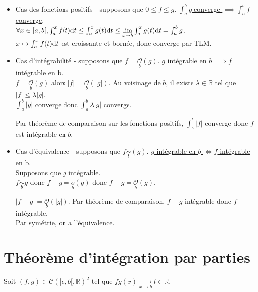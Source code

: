 \documentclass[]{article}
\begin{document}
\begin{itemize}
    \item Cas des fonctions positifs - supposons que $0 \leq f \leq g$. \underline{$\int_{a}^{b} g$ converge $\implies \int_{a}^{b} f$ converge}. \\
    
    $\forall x \in [a, b[, \int_{a}^{x}f(t) \text{d}t \leq \int_{a}^{x} g(t) \text{d}t \leq \underset{x \rightarrow b}{\lim} \int_{a}^{x} g(t) \text{d}t = \int_{a}^{b} g$. \\

    $x \mapsto \int_{a}^{x} f(t) \text{d}t$ est croissante et bornée, donc converge par TLM. 
    \item Cas d'intégrabilité - supposons que $f = \underset{b}{\mathcal{O}} (g)$. \underline{$g$ intégrable en $b$ $\implies f$ intégrable en b}. \\
    
    $f = \underset{b}{\mathcal{O}} (g)$ alors $|f| = \underset{b}{\mathcal{O}} (|g|)$. Au voisinage de $b$, il existe $\lambda \in \mathbb{R}$ tel que $|f| \leq \lambda |g|$. \\

    $\int_{a}^{b} |g|$ converge donc $\int_{a}^{b} \lambda |g|$ converge. 
    
    Par théorème de comparaison sur les fonctions positifs, $\int_{a}^{b}|f|$ converge donc $f$ est intégrable en $b$. 

    \item Cas d'équivalence - supposons que $f \underset{b}{\sim} (g)$. \underline{$g$ intégrable en $b$ $\iff f$ intégrable en b}. \\
    
    Supposons que $g$ intégrable. \\

    $f \underset{b}{\sim} g$ donc $f - g = \underset{b}{o} (g)$ donc $f - g = \underset{b}{\mathcal{O}} (g)$. 

    $|f - g| = \underset{b}{\mathcal{O}} (|g|)$. Par théorème de comparaison, $f-g$ intégrable donc $f$ intégrable.\\

    Par symétrie, on a l'équivalence. 
\end{itemize}

\section{Théorème d'intégration par parties}

Soit $(f,g) \in \mathcal{C}([a, b[, \mathbb{R})^2$ tel que $fg(x) \underset{x \rightarrow b}{\longrightarrow} l \in \mathbb{R}$. 
\end{document}
